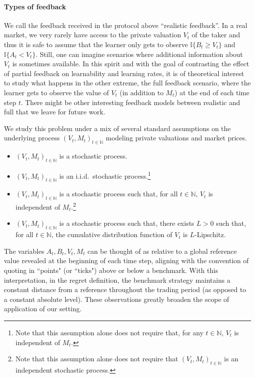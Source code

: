 \documentclass[final,12pt]{colt2025}
\newcommand{\I}{\mathbb{I}}
\newcommand{\N}{\mathbb{N}}
\newcommand{\nP}{M}
\newcommand{\nZ}{V}
\newcommand{\nB}{B}
\newcommand{\nS}{A}
\begin{document}
\paragraph{Types of feedback} We call the feedback received in the protocol above ``realistic feedback''. In a real market, we very rarely have access to the private valuation $\nZ_t$ of the taker and thus it is safe to assume that the learner only gets to observe $\I\{\nB_t \ge \nZ_t\}$ and $\I\{\nS_t < \nZ_t\}$. Still, one can imagine scenarios where additional information about $\nZ_t$ is sometimes available. 
In this spirit and with the goal of contrasting the effect of partial feedback on learnability and learning rates, it is of theoretical interest 
to study what happens in the other extreme, the full feedback scenario, where the learner gets to observe the value of $\nZ_t$ (in addition to $\nP_t$) at the end of each time step $t$. There might be other interesting feedback models between realistic and full that we leave for future work.
\fi

We study this problem under a mix of several standard assumptions on the underlying process $(\nZ_t, \nP_t)_{t\in\N}$ modeling private valuations and market prices.
\begin{itemize}
    \item[(adv)] $(\nZ_t, \nP_t)_{t\in\N}$ is a stochastic process.
    \item[(iid)] $(\nZ_t, \nP_t)_{t\in\N}$ is an i.i.d.\ stochastic process.\footnote{Note that this assumption alone does not require that, for any $t\in\N$, $\nZ_t$ is independent of $\nP_t$.}
    \item[(iv)] $(\nZ_t, \nP_t)_{t\in\N}$ is a stochastic process such that, for all $t \in \N$, $\nZ_t$ is independent of $\nP_t$.\footnote{Note that this assumption alone does not require that $(\nZ_t, \nP_t)_{t\in\N}$ is an independent stochastic process.}
    \item[(lip)] $(\nZ_t, \nP_t)_{t\in\N}$ is a stochastic process such that, there exists $L > 0$ such that, for all $t \in \N$, the cumulative distribution function of $\nZ_t$ is $L$-Lipschitz.
\end{itemize}

The variables $\nS_t,\nB_t,\nZ_t,\nP_t$ can be thought of as relative to a global reference value revealed at the beginning of each time step, aligning with the convention of quoting in ``points" (or ``ticks") above or below a benchmark. 
With this interpretation, in the regret definition, the benchmark strategy maintains a constant distance from a reference throughout the trading period (as opposed to a constant absolute level).
These observations greatly broaden the scope of application of our setting. 
\end{document}
